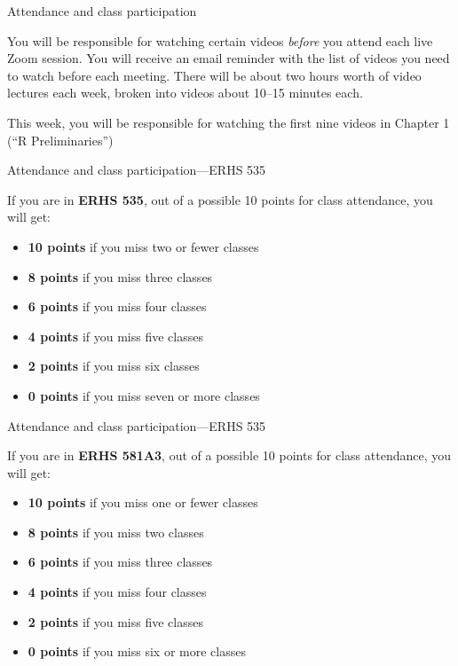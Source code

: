 \documentclass[
  10pt,
  ignorenonframetext,
]{beamer}
\providecommand{\tightlist}{%
  \setlength{\itemsep}{0pt}\setlength{\parskip}{0pt}}
\begin{document}
\begin{frame}{Attendance and class participation}
\protect\hypertarget{attendance-and-class-participation-6}{}

You will be responsible for watching certain videos \emph{before} you
attend each live Zoom session. You will receive an email reminder with
the list of videos you need to watch before each meeting. There will be
about two hours worth of video lectures each week, broken into videos
about 10--15 minutes each.

This week, you will be responsible for watching the first nine videos in
Chapter 1 (``R Preliminaries'')

\end{frame}

\begin{frame}{Attendance and class participation---ERHS 535}
\protect\hypertarget{attendance-and-class-participationerhs-535}{}

If you are in \textbf{ERHS 535}, out of a possible 10 points for class
attendance, you will get:

\begin{itemize}
\tightlist
\item
  \textbf{10 points} if you miss two or fewer classes
\item
  \textbf{8 points} if you miss three classes
\item
  \textbf{6 points} if you miss four classes
\item
  \textbf{4 points} if you miss five classes
\item
  \textbf{2 points} if you miss six classes
\item
  \textbf{0 points} if you miss seven or more classes
\end{itemize}

\end{frame}

\begin{frame}{Attendance and class participation---ERHS 535}
\protect\hypertarget{attendance-and-class-participationerhs-535-1}{}

If you are in \textbf{ERHS 581A3}, out of a possible 10 points for class
attendance, you will get:

\begin{itemize}
\tightlist
\item
  \textbf{10 points} if you miss one or fewer classes
\item
  \textbf{8 points} if you miss two classes
\item
  \textbf{6 points} if you miss three classes
\item
  \textbf{4 points} if you miss four classes
\item
  \textbf{2 points} if you miss five classes
\item
  \textbf{0 points} if you miss six or more classes
\end{itemize}

\end{frame}
\end{document}
